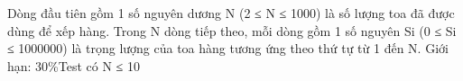 Dòng đầu tiên gồm 1 số nguyên dương N (2 ≤ N ≤ 1000) là số lượng toa đã được dùng để xếp hàng.  Trong N dòng tiếp theo, mỗi dòng gồm 1 số nguyên Si (0 ≤ Si ≤ 1000000) là trọng lượng của toa hàng tương ứng theo thứ tự từ 1 đến N.    Giới hạn: 30\%Test có N ≤ 10